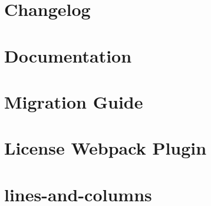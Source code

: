 \documentclass[twoside]{book}
\newcommand{\+}{\discretionary{\mbox{\scriptsize$\hookleftarrow$}}{}{}}
\begin{document}
\chapter{Changelog}
\label{md__c___users_vaishnavi_jadhav__desktop__developer_code_mean_stack_example_client_node_modules_lcb3c25531ab6d1942ff6a44022e98506}

\chapter{Documentation}
\label{md__c___users_vaishnavi_jadhav__desktop__developer_code_mean_stack_example_client_node_modules_l6cfad5670dec6a1a0d4f1eaa40b1ec2c}

\chapter{Migration Guide}
\label{md__c___users_vaishnavi_jadhav__desktop__developer_code_mean_stack_example_client_node_modules_l3b08027607c438b305731644179f352e}

\chapter{License Webpack Plugin}
\label{md__c___users_vaishnavi_jadhav__desktop__developer_code_mean_stack_example_client_node_modules_l075452677075d635784f8900cd26ceda}

\chapter{lines-\/and-\/columns}
\label{md__c___users_vaishnavi_jadhav__desktop__developer_code_mean_stack_example_client_node_modules_lines_and_columns__r_e_a_d_m_e}

\end{document}
